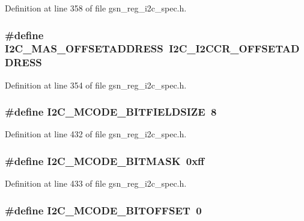 Definition at line 358 of file gsn\_\-reg\_\-i2c\_\-spec.h.

\hypertarget{a00558_acb32e8093c8b2f4235ca3982531ec79a}{
\subsubsection[{I2C\_\-MAS\_\-OFFSETADDRESS}]{\setlength{\rightskip}{0pt plus 5cm}\#define I2C\_\-MAS\_\-OFFSETADDRESS~I2C\_\-I2CCR\_\-OFFSETADDRESS}}
\label{a00558_acb32e8093c8b2f4235ca3982531ec79a}


Definition at line 354 of file gsn\_\-reg\_\-i2c\_\-spec.h.

\hypertarget{a00558_ae88d185c49c342a7afd4f34ebbf85e66}{
\subsubsection[{I2C\_\-MCODE\_\-BITFIELDSIZE}]{\setlength{\rightskip}{0pt plus 5cm}\#define I2C\_\-MCODE\_\-BITFIELDSIZE~8}}
\label{a00558_ae88d185c49c342a7afd4f34ebbf85e66}


Definition at line 432 of file gsn\_\-reg\_\-i2c\_\-spec.h.

\hypertarget{a00558_acbfaaee85e30a86dfaa72842b8e4f54a}{
\subsubsection[{I2C\_\-MCODE\_\-BITMASK}]{\setlength{\rightskip}{0pt plus 5cm}\#define I2C\_\-MCODE\_\-BITMASK~0xff}}
\label{a00558_acbfaaee85e30a86dfaa72842b8e4f54a}


Definition at line 433 of file gsn\_\-reg\_\-i2c\_\-spec.h.

\hypertarget{a00558_a9b32763594e0035825f8a261bb29482d}{
\subsubsection[{I2C\_\-MCODE\_\-BITOFFSET}]{\setlength{\rightskip}{0pt plus 5cm}\#define I2C\_\-MCODE\_\-BITOFFSET~0}}
\label{a00558_a9b32763594e0035825f8a261bb29482d}


